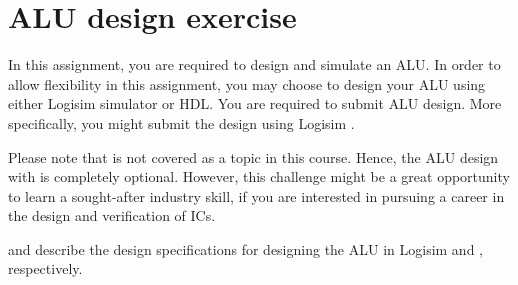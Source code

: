 \documentclass[number=03]{assignment}
\begin{document}

 
\newpage

\newpage
\section{ALU design exercise}\label{Sec:ALU_design}
In this assignment, you are required to design and simulate an \ac{ALU}.
In order to allow flexibility in this assignment, you may choose to design your \ac{ALU} using either Logisim simulator or \SV \ac{HDL}.
You are required to submit  \ac{ALU} design.
More specifically, you might submit the design using Logisim  \SV.

Please note that \SV is not covered as a topic in this course.
Hence, the \ac{ALU} design with \SV is completely optional.
However, this challenge might be a great opportunity to learn a sought-after industry skill, if you are interested in pursuing a career in the design and verification of \acp{IC}.

 and  describe the design specifications for designing the \ac{ALU} in Logisim and \SV, respectively.
\end{document}
